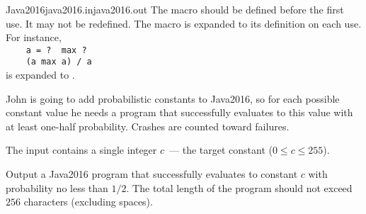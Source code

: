 \begin{problem}{Java2016}{java2016.in}{java2016.out}{\timeLimit}
The macro should be defined before the first use. It may not be redefined.
The macro is expanded to its definition on each use. For instance,
\\\verb|    a = ?  max ?|
\\\verb|    (a max a) / a|
\\is expanded to .

John is going to add probabilistic constants to Java2016, so for each
possible constant value he needs a program that successfully
evaluates to this value with at least one-half probability.
Crashes are counted toward failures. 

\InputFile

The input contains a single integer $c$~--- the target constant
($0 \le c \le 255$).  

\OutputFile

Output a Java2016 program that successfully evaluates to constant $c$ with probability
no less than $1/2$. The total length of the program should not exceed 
$256$ characters (excluding spaces).

\Examples

\begin{example}
%
%
\end{example}%
\end{problem}
